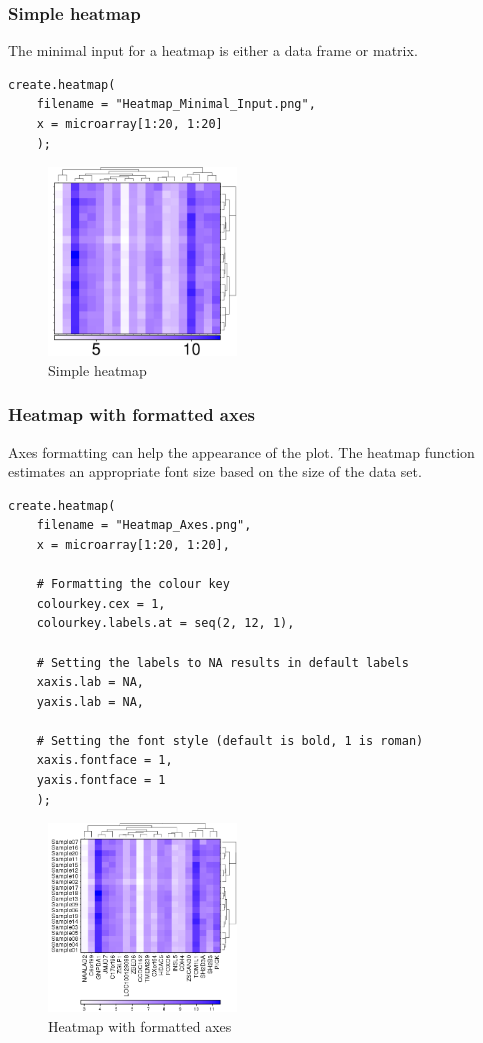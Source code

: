 \documentclass[letterpaper]{article}
\begin{document}
\subsubsection{Simple heatmap}
The minimal input for a heatmap is either a data frame or matrix. 

\begin{verbatim}
create.heatmap(
    filename = "Heatmap_Minimal_Input.png",
    x = microarray[1:20, 1:20]
    );
\end{verbatim}

\begin{figure}[!ht]
  \begin{center}
     \includegraphics[width=50mm]{Figures/Heatmap_Minimal_Input.png}
     \caption{Simple heatmap}
  \end{center}
\end{figure}

\subsubsection{Heatmap with formatted axes}
Axes formatting can help the appearance of the plot. The heatmap function estimates an appropriate font size based on the size of the data set.
\begin{verbatim}
create.heatmap(
    filename = "Heatmap_Axes.png",
    x = microarray[1:20, 1:20],
    
    # Formatting the colour key
    colourkey.cex = 1,
    colourkey.labels.at = seq(2, 12, 1),    
    
    # Setting the labels to NA results in default labels
    xaxis.lab = NA,
    yaxis.lab = NA,
    
    # Setting the font style (default is bold, 1 is roman)
    xaxis.fontface = 1,
    yaxis.fontface = 1
    );
\end{verbatim}

\begin{figure}[!ht]
  \begin{center}
     \includegraphics[width=50mm]{Figures/Heatmap_Axes.png}
     \caption{Heatmap with formatted axes}
  \end{center}
\end{figure}
\end{document}
